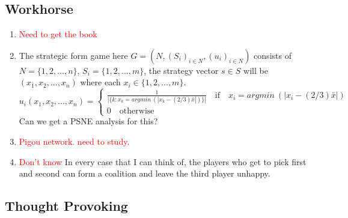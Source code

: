 \documentclass{article}
\begin{document}
\subsection{Workhorse}
\begin{enumerate}
	\item \textcolor{red}{Need to get the book}
	\item The strategic form game here $G = (N, (S_i)_{i \in N}, (u_i)_{i \in N})$ consists of $N = \{1,2, ..., n\}$, $S_i = \{1,2, ..., m\}$, the strategy vector $s \in S$ will be $(x_1, x_2, ..., x_n)$ where each $x_i \in \{1,2, ..., m\}$.
	\[
		u_i(x_1, x_2, ..., x_n) = 
		\begin{cases}
			\frac{1}{|\{k: x_k = argmin~(|x_k - (2/3)\bar{x}|)\}|} \quad \text{if} \quad x_i = argmin~(|x_i - (2/3)\bar{x}|)\\
			0 \quad \text{otherwise}
		\end{cases}
	\]
	Can we get a PSNE analysis for this?
	\item \textcolor{red}{Pigou network. need to study.}
	\item \textcolor{red}{Don't know} In every case that I can think of, the players who get to pick first and second can form a coalition and leave the third player unhappy.
\end{enumerate}
\subsection{Thought Provoking}
	
	
\end{document}
